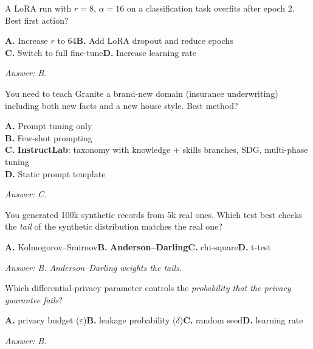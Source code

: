 \begin{practicebox}[title=\textbf{Q3.5 --- LoRA hyperparameters}]
A LoRA run with $r=8$, $\alpha=16$ on a classification task overfits after epoch 2. Best first action?

\textbf{A.} Increase $r$ to 64\hspace{1em}\textbf{B.} Add LoRA dropout and reduce epochs\\
\textbf{C.} Switch to full fine-tune\hspace{1em}\textbf{D.} Increase learning rate

\vspace{0.2cm}\textit{Answer: B.}
\end{practicebox}

\begin{practicebox}[title=\textbf{Q3.6 --- InstructLab}]
You need to teach Granite a brand-new domain (insurance underwriting) including both new facts and a new house style. Best method?

\textbf{A.} Prompt tuning only\\
\textbf{B.} Few-shot prompting\\
\textbf{C.} \textbf{InstructLab}: taxonomy with knowledge + skills branches, SDG, multi-phase tuning\\
\textbf{D.} Static prompt template

\vspace{0.2cm}\textit{Answer: C.}
\end{practicebox}

\begin{practicebox}[title=\textbf{Q3.7 --- SDG fidelity}]
You generated 100k synthetic records from 5k real ones. Which test best checks the \emph{tail} of the synthetic distribution matches the real one?

\textbf{A.} Kolmogorov--Smirnov\hspace{1em}\textbf{B.} \textbf{Anderson--Darling}\hspace{1em}\textbf{C.} chi-square\hspace{1em}\textbf{D.} t-test

\vspace{0.2cm}\textit{Answer: B. Anderson--Darling weights the tails.}
\end{practicebox}

\begin{practicebox}[title=\textbf{Q3.8 --- Differential privacy}]
Which differential-privacy parameter controls the \emph{probability that the privacy guarantee fails}?

\textbf{A.} privacy budget ($\varepsilon$)\hspace{1em}\textbf{B.} leakage probability ($\delta$)\hspace{1em}\textbf{C.} random seed\hspace{1em}\textbf{D.} learning rate

\vspace{0.2cm}\textit{Answer: B.}
\end{practicebox}

\cleardoublepage
